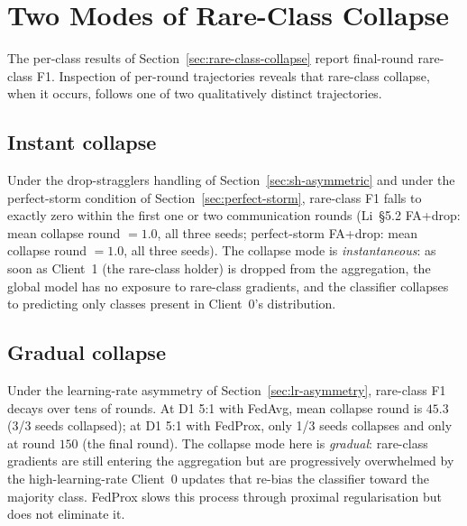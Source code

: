 \documentclass[11pt,a4paper]{report}
\begin{document}

\section{Two Modes of Rare-Class Collapse}
\label{sec:collapse-modes}

The per-class results of Section~\ref{sec:rare-class-collapse} report
final-round rare-class F1. Inspection of per-round trajectories
reveals that rare-class collapse, when it occurs, follows one of two
qualitatively distinct trajectories.

\subsection{Instant collapse}
Under the drop-stragglers handling of Section~\ref{sec:sh-asymmetric}
and under the perfect-storm condition of
Section~\ref{sec:perfect-storm}, rare-class F1 falls to exactly zero
within the first one or two communication rounds (Li~§5.2 FA+drop:
mean collapse round $= 1.0$, all three seeds; perfect-storm FA+drop:
mean collapse round $= 1.0$, all three seeds). The collapse mode is
\emph{instantaneous}: as soon as Client~1 (the rare-class holder) is
dropped from the aggregation, the global model has no exposure to
rare-class gradients, and the classifier collapses to predicting only
classes present in Client~0's distribution.

\subsection{Gradual collapse}
Under the learning-rate asymmetry of Section~\ref{sec:lr-asymmetry},
rare-class F1 decays over tens of rounds. At D1 5:1 with FedAvg,
mean collapse round is $45.3$ (3/3 seeds collapsed); at D1 5:1 with
FedProx, only 1/3 seeds collapses and only at round $150$ (the final
round). The collapse mode here is \emph{gradual}: rare-class
gradients are still entering the aggregation but are progressively
overwhelmed by the high-learning-rate Client~0 updates that re-bias
the classifier toward the majority class. FedProx slows this process
through proximal regularisation but does not eliminate it.
\end{document}

